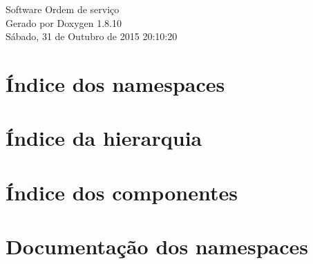 \documentclass[twoside]{book}
\newcommand{\+}{\discretionary{\mbox{\scriptsize$\hookleftarrow$}}{}{}}
\newcommand{\clearemptydoublepage}{%
  \newpage{\pagestyle{empty}\cleardoublepage}%
}
\begin{document}
\hypersetup{pageanchor=false,
             bookmarks=true,
             bookmarksnumbered=true,
             pdfencoding=unicode
            }
\begin{titlepage}
\vspace*{7cm}
\begin{center}%
{\Large Software Ordem de serviço }\\
\vspace*{1cm}
{\large Gerado por Doxygen 1.8.10}\\
\vspace*{0.5cm}
{\small Sábado, 31 de Outubro de 2015 20:10:20}\\
\end{center}
\end{titlepage}
\clearemptydoublepage
\tableofcontents
\clearemptydoublepage
{}
\hypersetup{pageanchor=true}

\chapter{Índice dos namespaces}

\chapter{Índice da hierarquia}

\chapter{Índice dos componentes}

\chapter{Documentação dos namespaces}












\end{document}
